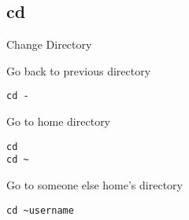 \subsection{cd}

\begin{frame}[fragile]{Change Directory}
  \begin{exampleblock}{Go back to previous directory}
    \begin{lstlisting}[showstringspaces=false,basicstyle=\tiny]
cd -
    \end{lstlisting}
  \end{exampleblock}
  \pause

  \begin{exampleblock}{Go to home directory}
    \begin{lstlisting}[showstringspaces=false,basicstyle=\tiny]
cd
cd ~
    \end{lstlisting}
  \end{exampleblock}
  \pause

  \begin{exampleblock}{Go to someone else home's directory}
    \begin{lstlisting}[showstringspaces=false,basicstyle=\tiny]
cd ~username
    \end{lstlisting}
  \end{exampleblock}
\end{frame}
